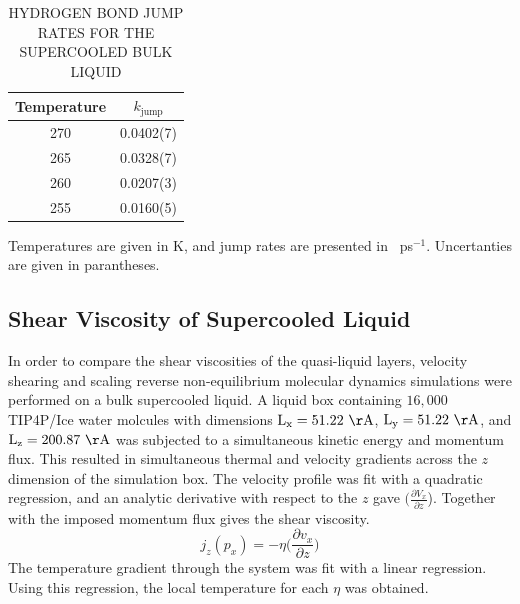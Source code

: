 \begin{table}[h] \centering \caption{HYDROGEN BOND JUMP RATES FOR THE
    SUPERCOOLED BULK LIQUID\label{tab:bulkJump}}
\begin{tabular}{cc}
\hline
\hline
 Temperature & $k_\mathrm{jump}$ \\
\hline
270 & 0.0402(7) \\
265 & 0.0328(7) \\
260 & 0.0207(3)  \\
255 & 0.0160(5) \\
\hline
\hline
\end{tabular}
\begin{flushleft}
  Temperatures are given in K, and jump rates are presented in
  ~ps$^{-1}$. Uncertanties are given in parantheses.
\end{flushleft}
\end{table}

           

\subsection{Shear Viscosity of Supercooled Liquid}
In order to compare the shear viscosities of the quasi-liquid layers,
velocity shearing and scaling reverse non-equilibrium molecular
dynamics simulations were performed on a bulk supercooled liquid. A
liquid box containing $16,000$ TIP4P/Ice water molcules with
dimensions $\mathrm{L_x} = 51.22~\mathrm{\AA}$,
$\mathrm{L_y} = 51.22~\mathrm{\AA}$, and
$\mathrm{L_z}=200.87~\mathrm{\AA}$ was subjected to a simultaneous
kinetic energy and momentum flux. This resulted in simultaneous
thermal and velocity gradients across the $z$ dimension of the
simulation box. The velocity profile was fit with a quadratic
regression, and an analytic derivative with respect to the $z$ gave
$(\frac{\partial V_x}{\partial z}$). Together with the imposed
momentum flux gives the shear viscosity.
\begin{equation}\label{eq:viscosity}
  j_{z}(p_{x}) = -\eta \big(\frac{\partial v_{x}}{\partial z}\big)
\end{equation}
The temperature gradient through the system was fit with a linear
regression. Using this regression, the local temperature for each
$\eta$ was obtained.  

